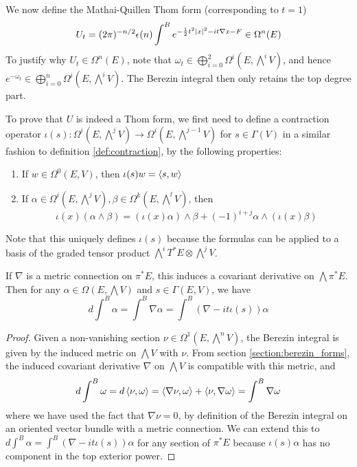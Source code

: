 We now define the Mathai-Quillen Thom form (corresponding to $t=1$)
\begin{equation}
	U_t = (2\pi)^{-n/2}\epsilon(n) \int^B e^{-\frac{1}{2}t^2\abs{x}^2-it\nabla x - F} \in \Omega^n(E)
\end{equation}
To justify why $U_t\in\Omega^n(E)$, note that
$\omega_t\in\bigoplus_{i=0}^2 \Omega^i(E,\bigwedge^iV)$, and hence 
$e^{-\omega_t} \in \bigoplus_{i=0}^n \Omega^i(E,\bigwedge^iV)$. The Berezin
integral then only retains the top degree part. 

To prove that $U$ is indeed a Thom form, we first need
to define a contraction operator $\iota(s):\Omega^i(E,\bigwedge^j V) \to
\Omega^i(E,\bigwedge^{j-1} V)$ for $s\in\Gamma(V)$ in
a similar fashion to definition \ref{def:contraction}, by the following
properties:
\begin{enumerate}[(1)]
    \item If $w\in \Omega^0(E,V)$, then  $\iota(s)w = \gen{s,w}$
	\item If $\alpha\in\Omega^i(E,\bigwedge^jV),
		\beta\in\Omega^k(E,\bigwedge^lV)$, then 
	 \[
	\iota(x)(\alpha\wedge \beta) 
	= (\iota(x)\alpha)\wedge\beta + (-1)^{i+j}\alpha\wedge(\iota(x)\beta)
	\] 
\end{enumerate}
Note that this uniquely defines $\iota(s)$ because the formulas can be applied
to a basis of the graded tensor product $\bigwedge^iT^*E\otimes \bigwedge^jV$.

\begin{prop} \label{prop:derivative_berezin} %
	If $\nabla$ is a metric connection on  $\pi^*E$, this induces a covariant
	derivative on $\bigwedge \pi^*E$. Then for any
	$\alpha\in\Omega(E,\bigwedge V)$ and $s\in \Gamma(E,V)$, we have 
	\[
	d\int^B \alpha = \int^B \nabla\alpha = \int^B (\nabla-it\iota(s))\alpha
	\] 
\end{prop}
\begin{proof} 
	Given a non-vanishing section $\nu\in \Omega^1(E,\bigwedge^nV)$,
	the Berezin integral is given by the induced metric on $\bigwedge V$
	with  $\nu$. From section \ref{section:berezin_forms}, the induced covariant
	derivative $\nabla$ on $\bigwedge V$ is compatible with this metric, and 
	\[
	d\int^B\omega = d\gen{\nu,\omega} = \gen{\nabla \nu, \omega} + \gen{\nu, \nabla \omega}
	=\int^B \nabla\omega
	\] 
	where we have used the fact that $\nabla \nu = 0$, by definition of the
	Berezin integral on an oriented vector bundle with a metric connection.
	We can extend this to 
	$d\int^B\alpha = \int^B (\nabla-it\iota(s))\alpha$ for any section of
	$\pi^*E$ because $\iota(s)\alpha$ has no component in 
	the top exterior power.	
\end{proof}

